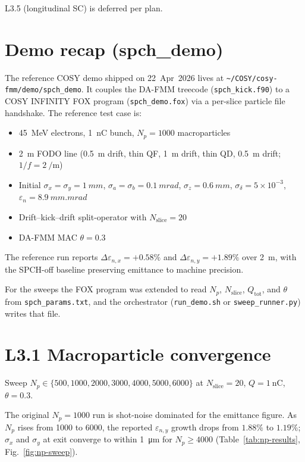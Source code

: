 \documentclass[11pt]{article}
\begin{document}
L3.5 (longitudinal SC) is deferred per plan.

\section{Demo recap (spch\_demo)}

The reference COSY demo shipped on 22~Apr~2026 lives at
\texttt{\textasciitilde/COSY/cosy-fmm/demo/spch\_demo}. It couples the
DA-FMM treecode (\texttt{spch\_kick.f90}) to a COSY INFINITY FOX
program (\texttt{spch\_demo.fox}) via a per-slice particle file
handshake. The reference test case is:

\begin{itemize}
\item \SI{45}{\mega\eV} electrons, \SI{1}{\nano\coulomb} bunch,
      $N_p = 1000$ macroparticles
\item 2~m FODO line
      (\SI{0.5}{\m} drift, thin QF, \SI{1}{\m} drift, thin QD,
      \SI{0.5}{\m} drift; $1/f = \SI{2}{\per\meter}$)
\item Initial $\sigma_x = \sigma_y = \SI{1}{mm}$,
      $\sigma_a = \sigma_b = \SI{0.1}{mrad}$,
      $\sigma_z = \SI{0.6}{mm}$, $\sigma_\delta = 5\times 10^{-3}$,
      $\varepsilon_n = \SI{8.9}{mm.mrad}$
\item Drift--kick--drift split-operator with $N_\mathrm{slice}=20$
\item DA-FMM MAC $\theta = 0.3$
\end{itemize}

The reference run reports
$\Delta\varepsilon_{n,x} = +0.58\%$ and
$\Delta\varepsilon_{n,y} = +1.89\%$ over \SI{2}{m}, with the SPCH-off
baseline preserving emittance to machine precision.

For the sweeps the FOX program was extended to read $N_p$,
$N_\mathrm{slice}$, $Q_\mathrm{tot}$, and $\theta$ from
\texttt{spch\_params.txt}, and the orchestrator (\texttt{run\_demo.sh}
or \texttt{sweep\_runner.py}) writes that file.

\section{L3.1 Macroparticle convergence}

Sweep $N_p \in \{500, 1000, 2000, 3000, 4000, 5000, 6000\}$ at
$N_\mathrm{slice}=20$, $Q=\SI{1}{\nano\coulomb}$, $\theta=0.3$.

The original $N_p=1000$ run is shot-noise dominated for
the emittance figure. As $N_p$ rises from 1000 to 6000, the reported
$\varepsilon_{n,y}$ growth drops from $1.88\%$ to $1.19\%$; $\sigma_x$
and $\sigma_y$ at exit converge to within \SI{1}{\micro\meter} for
$N_p \geq 4000$ (Table~\ref{tab:np-results}, Fig.~\ref{fig:np-sweep}).
\end{document}
